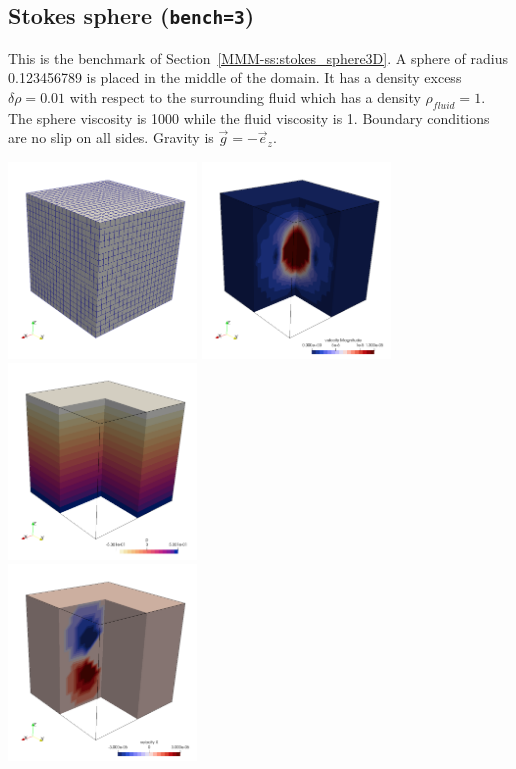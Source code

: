 \subsection*{Stokes sphere ({\tt bench=3})}

This is the benchmark of Section~\ref{MMM-ss:stokes_sphere3D}.
A sphere of radius 0.123456789 is placed in the middle of the domain. 
It has a density excess $\delta\rho=0.01$
with respect to the surrounding fluid which has a density $\rho_{fluid}=1$. 
The sphere viscosity is 1000 while the fluid viscosity is 1.
Boundary conditions are no slip on all sides. Gravity is $\vec{g}=-\vec{e}_z$.

\begin{center}
\includegraphics[width=5cm]{python_codes/fieldstone_82/results/bench3/grid.png}
\includegraphics[width=5cm]{python_codes/fieldstone_82/results/bench3/vel.png}
\includegraphics[width=5cm]{python_codes/fieldstone_82/results/bench3/press.png}\\
\includegraphics[width=5cm]{python_codes/fieldstone_82/results/bench3/u.png}

\end{center}
